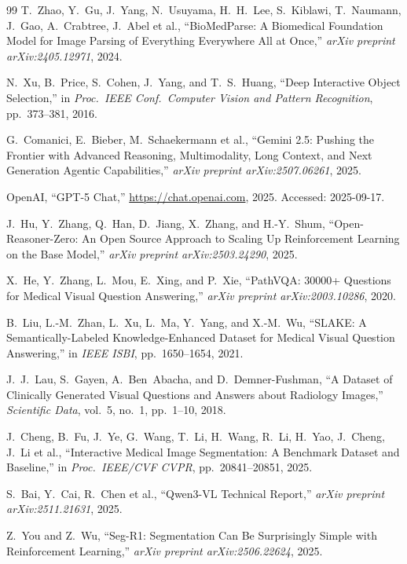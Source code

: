 \documentclass[12pt, a4paper]{article}
\begin{document}
\begin{thebibliography}{99}
T.~Zhao, Y.~Gu, J.~Yang, N.~Usuyama, H.~H.~Lee, S.~Kiblawi, T.~Naumann, J.~Gao,
A.~Crabtree, J.~Abel et al.,
``BioMedParse: A Biomedical Foundation Model for Image Parsing of Everything Everywhere
All at Once,'' \textit{arXiv preprint arXiv:2405.12971}, 2024.

N.~Xu, B.~Price, S.~Cohen, J.~Yang, and T.~S.~Huang,
``Deep Interactive Object Selection,''
in \textit{Proc.\ IEEE Conf.\ Computer Vision and Pattern Recognition}, pp.~373--381, 2016.

G.~Comanici, E.~Bieber, M.~Schaekermann et al.,
``Gemini 2.5: Pushing the Frontier with Advanced Reasoning, Multimodality, Long Context,
and Next Generation Agentic Capabilities,''
\textit{arXiv preprint arXiv:2507.06261}, 2025.

OpenAI, ``GPT-5 Chat,'' \url{https://chat.openai.com}, 2025. Accessed: 2025-09-17.

J.~Hu, Y.~Zhang, Q.~Han, D.~Jiang, X.~Zhang, and H.-Y.~Shum,
``Open-Reasoner-Zero: An Open Source Approach to Scaling Up Reinforcement Learning on
the Base Model,'' \textit{arXiv preprint arXiv:2503.24290}, 2025.

X.~He, Y.~Zhang, L.~Mou, E.~Xing, and P.~Xie,
``PathVQA: 30000+ Questions for Medical Visual Question Answering,''
\textit{arXiv preprint arXiv:2003.10286}, 2020.

B.~Liu, L.-M.~Zhan, L.~Xu, L.~Ma, Y.~Yang, and X.-M.~Wu,
``SLAKE: A Semantically-Labeled Knowledge-Enhanced Dataset for Medical Visual Question
Answering,'' in \textit{IEEE ISBI}, pp.~1650--1654, 2021.

J.~J.~Lau, S.~Gayen, A.~Ben~Abacha, and D.~Demner-Fushman,
``A Dataset of Clinically Generated Visual Questions and Answers about Radiology Images,''
\textit{Scientific Data}, vol.~5, no.~1, pp.~1--10, 2018.

J.~Cheng, B.~Fu, J.~Ye, G.~Wang, T.~Li, H.~Wang, R.~Li, H.~Yao, J.~Cheng, J.~Li
et al.,
``Interactive Medical Image Segmentation: A Benchmark Dataset and Baseline,''
in \textit{Proc.\ IEEE/CVF CVPR}, pp.~20841--20851, 2025.

S.~Bai, Y.~Cai, R.~Chen et al.,
``Qwen3-VL Technical Report,'' \textit{arXiv preprint arXiv:2511.21631}, 2025.

Z.~You and Z.~Wu,
``Seg-R1: Segmentation Can Be Surprisingly Simple with Reinforcement Learning,''
\textit{arXiv preprint arXiv:2506.22624}, 2025.

\end{thebibliography}
\end{document}
